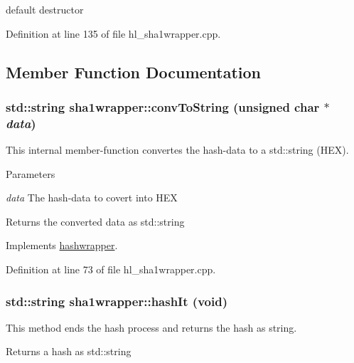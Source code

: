 default destructor 

Definition at line 135 of file hl\_\-sha1wrapper.cpp.

\subsection{Member Function Documentation}
\hypertarget{classsha1wrapper_a1339f960e306c6bde056191d66001152}{
\subsubsection[{convToString}]{\setlength{\rightskip}{0pt plus 5cm}std::string sha1wrapper::convToString (unsigned char $\ast$ {\em data})}}
\label{classsha1wrapper_a1339f960e306c6bde056191d66001152}


This internal member-\/function convertes the hash-\/data to a std::string (HEX). 
\begin{DoxyParams}{Parameters}
\item[{\em data}]The hash-\/data to covert into HEX \end{DoxyParams}
\begin{DoxyReturn}{Returns}
the converted data as std::string 
\end{DoxyReturn}


Implements \hyperlink{classhashwrapper_a1dacf43b1b726cd19a09d11eba6cd082}{hashwrapper}.

Definition at line 73 of file hl\_\-sha1wrapper.cpp.\hypertarget{classsha1wrapper_a88f493c77f0655eb0b8e577226c49904}{
\subsubsection[{hashIt}]{\setlength{\rightskip}{0pt plus 5cm}std::string sha1wrapper::hashIt (void)}}
\label{classsha1wrapper_a88f493c77f0655eb0b8e577226c49904}


This method ends the hash process and returns the hash as string. \begin{DoxyReturn}{Returns}
a hash as std::string 
\end{DoxyReturn}


